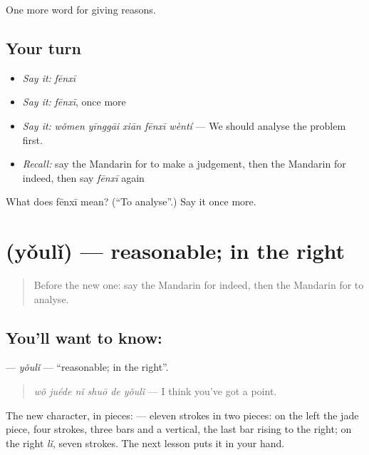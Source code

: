 \begin{grammarlens}[title={What you've built}]
One more word for giving reasons.
\end{grammarlens}

\subsection*{Your turn}
\begin{itemize}
\raggedright
  \item \emph{Say it:} \emph{fēnxī}
  \item \emph{Say it:} \emph{fēnxī}, once more
  \item \emph{Say it:} \emph{wǒmen yīnggāi xiān fēnxī wèntí} — We should analyse the problem first.
  \item \emph{Recall:} say the Mandarin for to make a judgement, then the Mandarin for indeed, then say \emph{fēnxī} again
\end{itemize}

\begin{tcolorbox}[breakable,colback=teal!4,colframe=teal!35!black,title={Before you move on}]
What does fēnxī mean? (\textquotedblleft{}To analyse\textquotedblright{}.) Say it once more.
\end{tcolorbox}
\section[\texorpdfstring{\zh{有理} (yǒulǐ)}{有理 (yǒulǐ)}]{ (yǒulǐ) — reasonable; in the right}

\label{lesson:ZH-C351-youli}



\begin{quote}
Before the new one: say the Mandarin for indeed, then the Mandarin for to analyse.
\end{quote}

\subsection*{You'll want to know: }
\textbf{} — \emph{yǒulǐ} — \textquotedblleft{}reasonable; in the right\textquotedblright{}.

\begin{quote}
\textbf{} \emph{wǒ juéde nǐ shuō de yǒulǐ} — I think you've got a point.
\end{quote}

The new character, in pieces:  — eleven strokes in two pieces: on the left the jade piece, four strokes, three bars and a vertical, the last bar rising to the right; on the right  \emph{lǐ}, seven strokes. The next lesson puts it in your hand.

